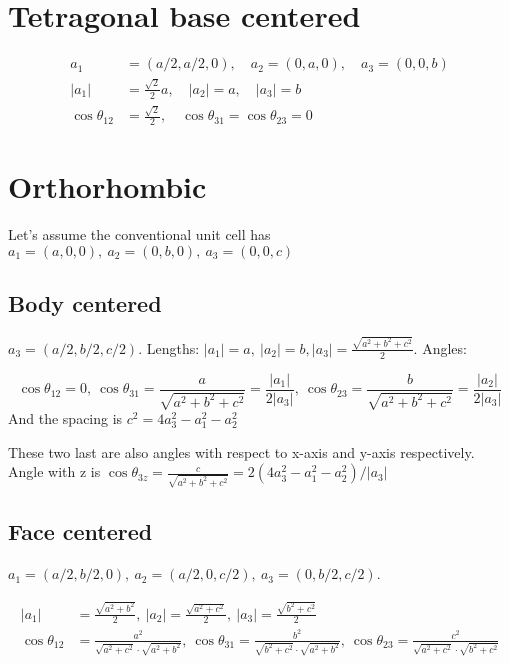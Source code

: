\documentclass[main.tex]{subfiles}
\begin{document}
	\section{Tetragonal base centered}
	\begin{align}
		a_1 &= (a/2,a/2,0), \quad a_2 = (0,a,0), \quad a_3 = (0,0,b) \\
		|a_1| &= \frac{\sqrt{2}}{2} a, \quad |a_2| = a, \quad |a_3| = b \\
		\cos \theta_{12} &= \frac{\sqrt{2}}{2}, \quad \cos \theta_{31} = \cos\theta_{23} = 0
	\end{align}
	
	\section{Orthorhombic}
	Let's assume the conventional unit cell has $a_1 = (a,0,0),\ a_2 = (0,b,0),\ a_3 = (0,0,c)$
	
	\subsection{Body centered}
	$a_3 = (a/2, b/2, c/2)$. Lengths: $|a_1| = a,\ |a_2| = b, |a_3| = \frac{\sqrt{a^2+b^2+c^2}}{2}$. Angles: 
	
	\begin{equation}
		\cos \theta_{12} = 0,\ \cos \theta_{31} = \frac{a}{\sqrt{a^2+b^2+c^2}} = \frac{|a_1|}{2|a_3|},\ \cos \theta_{23} = \frac{b}{\sqrt{a^2+b^2+c^2}} = \frac{|a_2|}{2|a_3|}
	\end{equation}
	And the spacing is $ c^2 = 4a_3^2-a_1^2-a_2^2 $
	
	These two last are also angles with respect to x-axis and y-axis respectively. Angle with z is $\cos\theta_{3z} = \frac{c}{\sqrt{a^2+b^2+c^2}} = 2(4a_3^2-a_1^2-a_2^2)/|a_3|$
	
	\subsection{Face centered}
	$ a_1 = (a/2,b/2,0), \ a_2 = (a/2,0,c/2), \ a_3 = (0,b/2,c/2) $.
	
	\begin{align} 
	|a_1| &= \frac{\sqrt{a^2+b^2}}{2}, \ |a_2| = \frac{\sqrt{a^2+c^2}}{2}, \ |a_3| = \frac{\sqrt{b^2+c^2}}{2} \\
	\cos \theta_{12} &= \frac{a^2}{\sqrt{a^2+c^2} \cdot \sqrt{a^2+b^2}},\ \cos \theta_{31} = \frac{b^2}{\sqrt{b^2+c^2} \cdot \sqrt{a^2+b^2}},\ \cos \theta_{23} = \frac{c^2}{\sqrt{a^2+c^2} \cdot \sqrt{b^2+c^2}} 
	\end{align}
	
\end{document}
